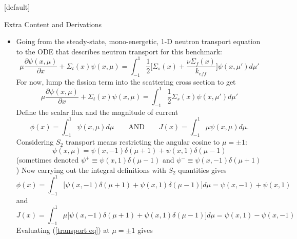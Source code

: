 \documentclass[9pt,t]{beamer}
\makeatletter
\newcommand{\QAND}{\qquad \text{AND} \qquad}
\newenvironment{withoutheadline}{
       \setbeamertemplate{headline}[default]
       \def\beamer@entrycode{\vspace*{-\headheight}}
    }{}
\makeatother
\begin{document}
\begin{withoutheadline}
\begin{frame}[allowframebreaks]{Extra Content and Derivations}
    \begin{itemize}
        \item Going from the steady-state, mono-energetic, 1-D neutron transport equation to the ODE that describes neutron transport for this benchmark:
        \begin{equation}
            \mu \frac{\partial \psi(x,\mu)}{\partial x} + \Sigma_{t}(x)\psi(x,\mu) =
            \int_{-1}^{1} \frac{1}{2}\big[\Sigma_{s}(x) + \frac{\nu \Sigma_{f}(x)}{k_{eff}}\big] \psi(x,\mu')d\mu'
        \end{equation}
        For now, lump the fission term into the scattering cross section to get
        \begin{equation} \label{transport eq}
            \mu \frac{\partial \psi(x,\mu)}{\partial x} + \Sigma_{t}(x)\psi(x,\mu) =
            \int_{-1}^{1} \frac{1}{2}\Sigma_{s}(x) \psi(x,\mu')d\mu'
        \end{equation}
        Define the scalar flux and the magnitude of current
        \begin{equation}
            \phi(x) = \int_{-1}^{1} \psi(x,\mu) d\mu \QAND J(x) = \int_{-1}^{1} \mu \psi(x,\mu) d\mu.
        \end{equation}
        Considering $S_{2}$ transport means restricting the angular cosine to $\mu = \pm 1$:
        \begin{equation}
            \psi(x,\mu) = \psi(x,-1) \delta(\mu+1) + \psi(x,1) \delta(\mu-1)
        \end{equation}
        (sometimes denoted $\psi^{+}\equiv \psi(x,1) \delta(\mu-1) $ and $\psi^{-}\equiv \psi(x,-1) \delta(\mu+1) $)
        \newpage
        Now carrying out the integral definitions with $S_{2}$ quantities gives
        \begin{equation} \label{scalar flux}
            \phi(x) = \int_{-1}^{1} \bigg[ \psi(x,-1) \delta(\mu+1) + \psi(x,1) \delta(\mu-1) \bigg]d\mu =
            \psi(x,-1) + \psi(x,1)
        \end{equation}
        and
        \begin{equation} \label{current}
            J(x) = \int_{-1}^{1} \mu \bigg[ \psi(x,-1) \delta(\mu+1) + \psi(x,1) \delta(\mu-1) \bigg] d\mu =
            \psi(x,1) - \psi(x,-1)
        \end{equation}
        Evaluating (\ref{transport eq}) at $\mu=\pm 1$ gives
        \begin{equation} \label{-1}

\end{equation}
\end{itemize}
\end{frame}
\end{withoutheadline}
\end{document}
